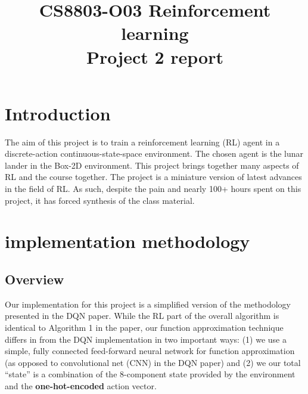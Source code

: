 \documentclass[conference]{IEEEtran}
\begin{document}
\title{CS8803-O03 Reinforcement learning\\Project 2 report}

\author{
}
\maketitle


\IEEEpeerreviewmaketitle
\section{Introduction}
The aim of this project is to train a reinforcement learning (RL) agent in a discrete-action continuous-state-space environment. The chosen agent is the lunar lander in the Box-2D environment. This project brings together many aspects of RL and the course together. The project is a miniature version of latest advances in the field of RL. As such, despite the pain and nearly 100+ hours spent on this project, it has forced synthesis of the class material.
\section{implementation methodology}
\subsection{Overview}
Our implementation for this project is a simplified version of the methodology presented in the DQN paper\cite{dqn}. While the RL part of the overall algorithm is identical to Algorithm 1 in the paper, our function approximation technique differs in from the DQN implementation in two important ways: (1) we use a simple, fully connected feed-forward neural network for function approximation (as opposed to convolutional net (CNN) in the DQN paper) and (2) we our total ``state'' is a combination of the 8-component state provided by the environment and the {\bf one-hot-encoded} action vector. 
\end{document}
